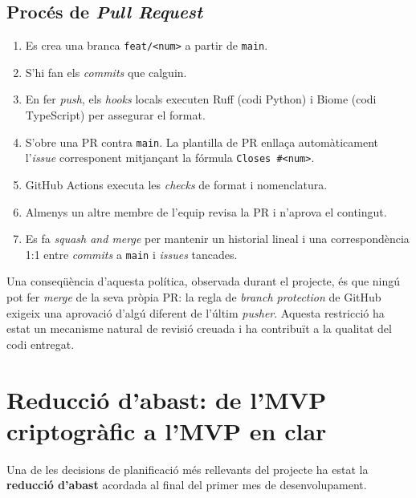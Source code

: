 \subsection{Procés de \emph{Pull Request}}
\label{subsec:proces-de-pull-request}

\begin{enumerate}
    \item Es crea una branca \texttt{feat/<num>} a partir de \texttt{main}.

    \item S'hi fan els \emph{commits} que calguin.

    \item En fer \emph{push}, els \emph{hooks} locals executen Ruff (codi Python) i Biome (codi TypeScript) per
    assegurar el format.

    \item S'obre una \ac{PR} contra \texttt{main}.
    La plantilla de \ac{PR} enllaça automàticament l'\emph{issue} corresponent mitjançant la fórmula \texttt{Closes
    \#<num>}.

    \item GitHub Actions executa les \emph{checks} de format i nomenclatura.

    \item Almenys un altre membre de l'equip revisa la \ac{PR} i n'aprova el contingut.

    \item Es fa \emph{squash and merge} per mantenir un historial lineal i una correspondència 1:1 entre \emph{commits}
    a \texttt{main} i \emph{issues} tancades.
\end{enumerate}

Una conseqüència d'aquesta política, observada durant el projecte, és que ningú pot fer \emph{merge} de la seva pròpia
\ac{PR}: la regla de \emph{branch protection} de GitHub exigeix una aprovació d'algú diferent de l'últim \emph{pusher}.
Aquesta restricció ha estat un mecanisme natural de revisió creuada i ha contribuït a la qualitat del codi entregat.



\section{Reducció d'abast: de l'MVP criptogràfic a l'MVP en clar}
\label{sec:reduccio-abast}

Una de les decisions de planificació més rellevants del projecte ha estat la \textbf{reducció d'abast} acordada al final
del primer mes de desenvolupament.

